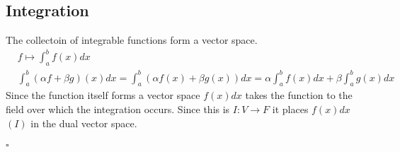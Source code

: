 \documentclass[a4paper]{article}
\begin{document}
\subsection{Integration \cite{wiki:integration}}
The collectoin of integrable functions form a vector space.
\begin{align}
  &f \mapsto \int_a^b f(x) dx\\
  &\int_a^b (\alpha f + \beta g)(x) dx = \int_a^b (\alpha f(x)+\beta g(x)) dx=\alpha \int_a^b f(x)dx + \beta \int_a^b g(x)dx
\end{align}
Since the function itself forms a vector space $f(x) dx$ takes the function to the field over which the integration occurs. Since this is $I:V \to F$ it places $f(x)dx$ $(I)$ in the dual vector space.
\\ \\
$\square$


\end{document}
